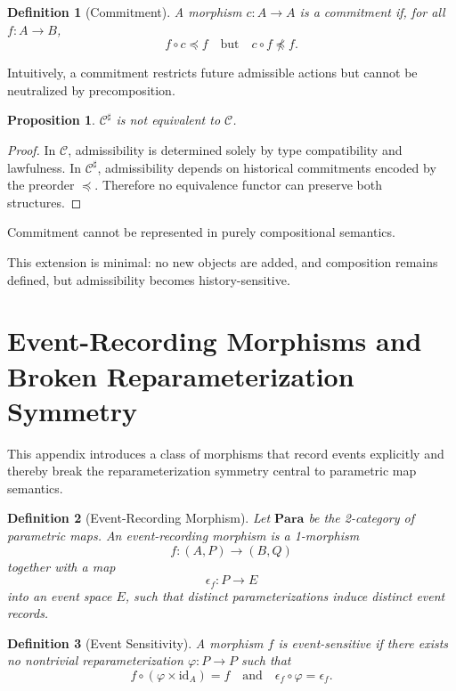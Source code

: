 \documentclass[11pt]{article}
\newtheorem{definition}{Definition}
\newtheorem{proposition}{Proposition}
\begin{document}
\begin{definition}[Commitment]
A morphism $c : A \to A$ is a \emph{commitment} if, for all $f : A \to B$,
\[
f \circ c \preceq f
\quad\text{but}\quad
c \circ f \not\preceq f.
\]
\end{definition}

Intuitively, a commitment restricts future admissible actions but cannot be
neutralized by precomposition.

\begin{proposition}
$\mathcal{C}^\sharp$ is not equivalent to $\mathcal{C}$.
\end{proposition}

\begin{proof}
In $\mathcal{C}$, admissibility is determined solely by type compatibility and
lawfulness. In $\mathcal{C}^\sharp$, admissibility depends on historical
commitments encoded by the preorder $\preceq$. Therefore no equivalence functor
can preserve both structures.
\end{proof}

\begin{corollary}
Commitment cannot be represented in purely compositional semantics.
\end{corollary}

This extension is minimal: no new objects are added, and composition remains
defined, but admissibility becomes history-sensitive.

\section{Event-Recording Morphisms and Broken Reparameterization Symmetry}

This appendix introduces a class of morphisms that record events explicitly and
thereby break the reparameterization symmetry central to parametric map
semantics.

\begin{definition}[Event-Recording Morphism]
Let $\mathbf{Para}$ be the 2-category of parametric maps. An
\emph{event-recording morphism} is a 1-morphism
\[
f : (A,P) \to (B,Q)
\]
together with a map
\[
\epsilon_f : P \to E
\]
into an event space $E$, such that distinct parameterizations induce distinct
event records.
\end{definition}

\begin{definition}[Event Sensitivity]
A morphism $f$ is \emph{event-sensitive} if there exists no nontrivial
reparameterization $\varphi : P \to P$ such that
\[
f \circ (\varphi \times \mathrm{id}_A) = f
\quad\text{and}\quad
\epsilon_f \circ \varphi = \epsilon_f.
\]
\end{definition}
\end{document}

